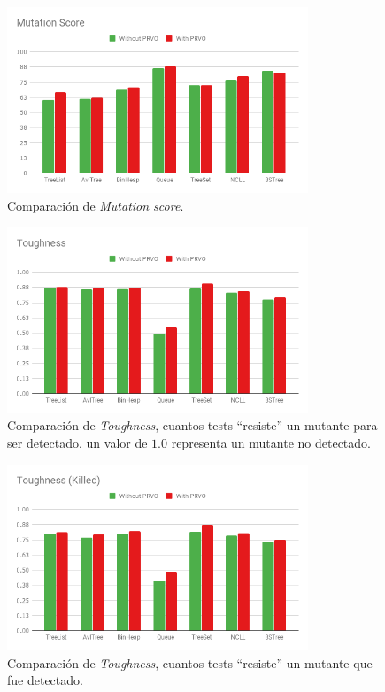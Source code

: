 \begin{figure}
	\begin{center}
		\includegraphics[width=9cm]{figures/MutationScore.png}
	\end{center}
	\caption{Comparaci\'on de \emph{Mutation score}.}
	\label{mutationscore-results}
\end{figure}

\begin{figure}
	\begin{center}
		\includegraphics[width=9cm]{figures/Toughness.png}
	\end{center}
	\caption{Comparaci\'on de \emph{Toughness}, cuantos tests ``resiste'' un mutante para ser detectado, un valor de $1.0$ representa un mutante no detectado.}
	\label{toughness-results}
\end{figure}

\begin{figure}
	\begin{center}
		\includegraphics[width=9cm]{figures/ToughnessKilled.png}
	\end{center}
	\caption{Comparaci\'on de \emph{Toughness}, cuantos tests ``resiste'' un mutante que fue detectado.}
	\label{toughnessKilled-results}
\end{figure}


